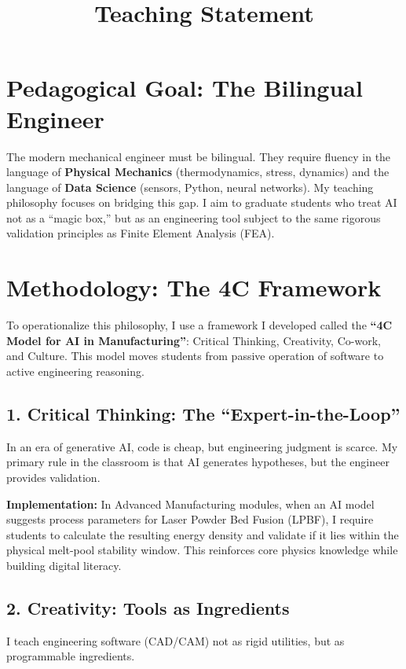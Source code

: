 \documentclass[10pt, a4paper]{article}
\title{\textbf{Teaching Statement}}
\author{}
\date{}
\begin{document}
\maketitle
\vspace{-4em} %

\section*{Pedagogical Goal: The Bilingual Engineer}

The modern mechanical engineer must be bilingual. They require fluency in the language of \textbf{Physical Mechanics} (thermodynamics, stress, dynamics) and the language of \textbf{Data Science} (sensors, Python, neural networks). My teaching philosophy focuses on bridging this gap. I aim to graduate students who treat AI not as a ``magic box,'' but as an engineering tool subject to the same rigorous validation principles as Finite Element Analysis (FEA).

\section*{Methodology: The 4C Framework}

To operationalize this philosophy, I use a framework I developed called the \textbf{``4C Model for AI in Manufacturing''}: Critical Thinking, Creativity, Co-work, and Culture. This model moves students from passive operation of software to active engineering reasoning.

\subsection*{1. Critical Thinking: The ``Expert-in-the-Loop''}
In an era of generative AI, code is cheap, but engineering judgment is scarce. My primary rule in the classroom is that AI generates hypotheses, but the engineer provides validation.

\textbf{Implementation:} In Advanced Manufacturing modules, when an AI model suggests process parameters for Laser Powder Bed Fusion (LPBF), I require students to calculate the resulting energy density and validate if it lies within the physical melt-pool stability window. This reinforces core physics knowledge while building digital literacy.

\subsection*{2. Creativity: Tools as Ingredients}
I teach engineering software (CAD/CAM) not as rigid utilities, but as programmable ingredients.
\end{document}
